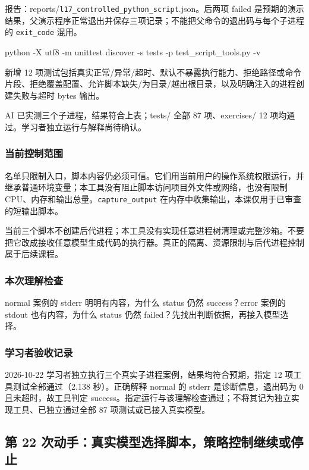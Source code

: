 报告：reports/\nolinkurl{l17_controlled_python_script}.json。后两项 failed 是预期的演示结果，父演示程序正常退出并保存三项记录；不能把父命令的退出码与每个子进程的 \nolinkurl{exit_code} 混用。

\begin{Code}
python -X utf8 -m unittest discover -s tests -p test_script_tools.py -v
\end{Code}

新增 12 项测试包括真实正常/异常/超时、默认不暴露执行能力、拒绝路径或命令片段、拒绝覆盖配置、允许脚本缺失/为目录/越出根目录，以及明确注入的进程创建失败与超时 bytes 输出。

AI 已实测三个子进程，结果符合上表；tests/ 全部 87 项、exercises/ 12 项均通过。学习者独立运行与解释尚待确认。

\subsubsection{当前控制范围}

名单只限制入口，脚本内容仍必须可信。它们用当前用户的操作系统权限运行，并继承普通环境变量；本工具没有阻止脚本访问项目外文件或网络，也没有限制 CPU、内存和输出总量。\nolinkurl{capture_output} 在内存中收集输出，本课仅用于已审查的短输出脚本。

当前三个脚本不创建后代进程；本工具没有实现任意进程树清理或完整沙箱。不要把它改成接收任意模型生成代码的执行器。真正的隔离、资源限制与后代进程控制属于后续课程。

\subsubsection{本次理解检查}

normal 案例的 stderr 明明有内容，为什么 status 仍然 success？error 案例的 stdout 也有内容，为什么 status 仍然 failed？先找出判断依据，再接入模型选择。

\subsubsection{学习者验收记录}

2026-10-22 学习者独立执行三个真实子进程案例，结果均符合预期，指定 12 项工具测试全部通过（2.138 秒）。正确解释 normal 的 stderr 是诊断信息，退出码为 0 且未超时，故工具判定 success。指定运行与该理解检查通过；不将其记为独立实现工具、已独立通过全部 87 项测试或已接入真实模型。

\subsection{第 22 次动手：真实模型选择脚本，策略控制继续或停止}

